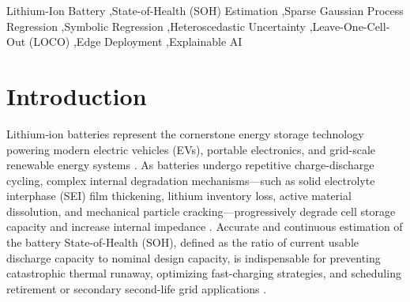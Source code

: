 \documentclass[a4paper,fleqn]{cas-sc}
\begin{document}
\begin{keywords}
Lithium-Ion Battery \sep State-of-Health (SOH) Estimation \sep Sparse Gaussian Process Regression \sep Symbolic Regression \sep Heteroscedastic Uncertainty \sep Leave-One-Cell-Out (LOCO) \sep Edge Deployment \sep Explainable AI
\end{keywords}

\maketitle

\section{Introduction}
Lithium-ion batteries represent the cornerstone energy storage technology powering modern electric vehicles (EVs), portable electronics, and grid-scale renewable energy systems \cite{xiong2023comprehensive, tian2025recent}. As batteries undergo repetitive charge-discharge cycling, complex internal degradation mechanisms—such as solid electrolyte interphase (SEI) film thickening, lithium inventory loss, active material dissolution, and mechanical particle cracking—progressively degrade cell storage capacity and increase internal impedance \cite{he2011prognostics, saha2013comparative, wang2025tradition}. Accurate and continuous estimation of the battery State-of-Health (SOH), defined as the ratio of current usable discharge capacity to nominal design capacity, is indispensable for preventing catastrophic thermal runaway, optimizing fast-charging strategies, and scheduling retirement or secondary second-life grid applications \cite{hu2026review, zhang2022capacity}.
\end{document}
